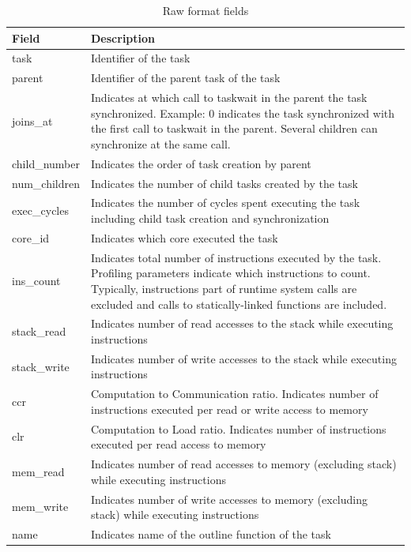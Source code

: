\documentclass[11pt,a4paper,notitlepage]{article}
\begin{document}
\begin{table}[!htb]
\begin{tabular}{|p{2.5cm}|p{10cm}|}
\hline
\textbf{Field} & \textbf{Description} \\ \hline
task & Identifier of the task \\ \hline
parent & Identifier of the parent task of the task \\ \hline
joins\_at & Indicates at which call to taskwait in the parent the task synchronized. Example: 0 indicates the task synchronized with the first call to taskwait in the parent. Several children can synchronize at the same call.  \\ \hline
child\_number & Indicates the order of task creation by parent \\ \hline
num\_children & Indicates the number of child tasks created by the task \\ \hline
exec\_cycles & Indicates the number of cycles spent executing the task including child task creation and synchronization \\ \hline
core\_id & Indicates which core executed the task \\ \hline
ins\_count & Indicates total number of instructions executed by the task. Profiling parameters indicate which instructions to count. Typically, instructions part of runtime system calls are excluded and calls to statically-linked functions are included.  \\ \hline
stack\_read & Indicates number of read accesses to the stack while executing instructions  \\ \hline
stack\_write & Indicates number of write accesses to the stack while executing instructions \\ \hline
ccr & Computation to Communication ratio. Indicates number of instructions executed per read or write access to memory  \\ \hline
clr & Computation to Load ratio. Indicates number of instructions executed per read access to memory  \\ \hline
mem\_read & Indicates number of read accesses to memory (excluding stack) while executing instructions  \\ \hline
mem\_write & Indicates number of write accesses to memory (excluding stack) while executing instructions  \\ \hline
name & Indicates name of the outline function of the task \\ \hline
\end{tabular}
\caption{Raw format fields}
\label{tab:raw-format}
\end{table}
\end{document}
